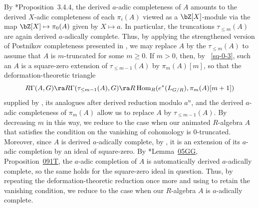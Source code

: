 By \cite{BS15}*{Proposition~3.4.4}, the derived $a$-adic completeness of $A$ amounts to the derived $X$-adic completeness of each $\pi_i(A)$ viewed as a $\bZ[X]$-module via the map $\bZ[X] \mapsto \pi_0(A)$ given by $X \mapsto a$. In particular, the truncations $\tau_{\le m}(A)$ are again derived $a$-adically complete. Thus, by applying the strengthened version of Postnikov completeness presented in , we may replace $A$ by the $\tau_{\le m}(A)$ to assume that $A$ is $m$-truncated for some $m \ge 0$. If $m > 0$, then, by ~\ref{sq-0-3}, such an $A$ is a square-zero extension of $\tau_{\le m - 1}(A)$ by $\pi_m(A)[m]$, so that the deformation-theoretic triangle
\[
R\Gamma(A, G) \ra R\Gamma(\tau_{\le m - 1}(A), G) \ra R\Hom_R(e^*(L_{G/R}), \pi_m(A)[m + 1])
\]
supplied by , its analogues after derived reduction modulo $a^n$, and the derived $a$-adic completeness of $\pi_m(A)$ allow us to replace $A$ by $\tau_{\le m - 1}(A)$. By decreasing $m$ in this way, we reduce to the case when our animated $R$-algebra $A$ that satisfies the condition on the vanishing of cohomology is $0$-truncated. Moreover, since $A$ is derived $a$-adically complete, by , it is an extension of its $a$-adic completion by an ideal of square-zero. By \cite{SP}*{Lemma~\href{https://stacks.math.columbia.edu/tag/05GG}{05GG}, Proposition~\href{https://stacks.math.columbia.edu/tag/091T}{091T}}, the $a$-adic completion of $A$ is automatically derived $a$-adically complete, so the same holds for the square-zero ideal in question. Thus, by repeating the deformation-theoretic reduction once more and using  to retain the vanishing condition, we reduce to the case when our $R$-algebra $A$ is $a$-adically complete.


